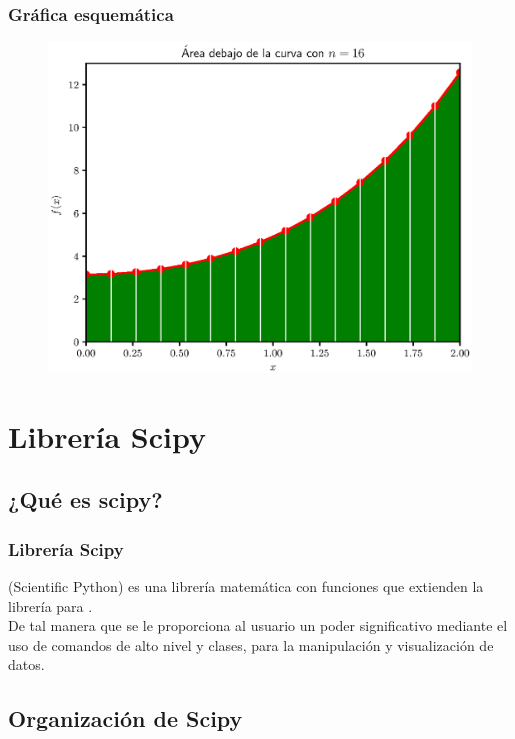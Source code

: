 \documentclass[12pt]{beamer}
\begin{document}
\begin{frame}
\frametitle{Gráfica esquemática}
\begin{figure}
    \centering
    \includegraphics[scale=0.55]{Imagenes/integracion_ejercicio_solido_rev_02.eps}
\end{figure}
\end{frame}

\section{Librería Scipy}
\subsection{¿Qué es scipy?}

\begin{frame}
\frametitle{Librería Scipy}
 (Scientific Python) es una librería matemática con funciones que extienden la librería  para \python.
\\
\bigskip
\pause
De tal manera que se le proporciona al usuario un poder significativo mediante el uso de comandos de alto nivel y clases, para la manipulación y visualización de datos.
\end{frame}

\subsection{Organización de Scipy}
\end{document}
